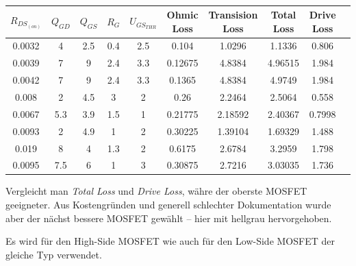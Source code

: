 \begin{table}[th!]
    \begin{center}
        \caption{}
        \label{tab:circuit:buck:mosfet}
        \begin{tabular}{cccccccccc}
            \toprule
            $R_{DS_{(on)}}$ & $Q_{GD}$ & $Q_{GS}$ & $R_G$ & $U_{GS_{THR}}$ & Ohmic Loss & Transision Loss & Total Loss & Drive Loss \\
            \midrule
            0.0032          & 4        & 2.5      & 0.4   & 2.5            & 0.104      & 1.0296          & 1.1336     & 0.806 \\
            0.0039          & 7        & 9        & 2.4   & 3.3            & 0.12675    & 4.8384          & 4.96515    & 1.984 \\
            0.0042          & 7        & 9        & 2.4   & 3.3            & 0.1365     & 4.8384          & 4.9749     & 1.984 \\
            0.008           & 2        & 4.5      & 3     & 2              & 0.26       & 2.2464          & 2.5064     & 0.558 \\
            0.0067          & 5.3      & 3.9      & 1.5   & 1              & 0.21775    & 2.18592         & 2.40367    & 0.7998 \\
            \rowcolor{lightgray}
            0.0093          & 2        & 4.9      & 1     & 2              & 0.30225    & 1.39104         & 1.69329    & 1.488 \\
            0.019           & 8        & 4        & 1.3   & 2              & 0.6175     & 2.6784          & 3.2959     & 1.798 \\
            0.0095          & 7.5      & 6        & 1     & 3              & 0.30875    & 2.7216          & 3.03035    & 1.736 \\
            \bottomrule
        \end{tabular}
    \end{center}
\end{table}

Vergleicht  man  \emph{Total  Loss}  und  \emph{Drive Loss}, w\"ahre der oberste
MOSFET  geeigneter. Aus Kostengr\"unden und  generell  schlechter  Dokumentation
wurde  aber  der   n\"achst  bessere  MOSFET  gew\"ahlt  --  hier  mit  hellgrau
hervorgehoben.

Es  wird  f\"ur  den  High-Side  MOSFET wie auch f\"ur den Low-Side  MOSFET  der
gleiche Typ verwendet.

